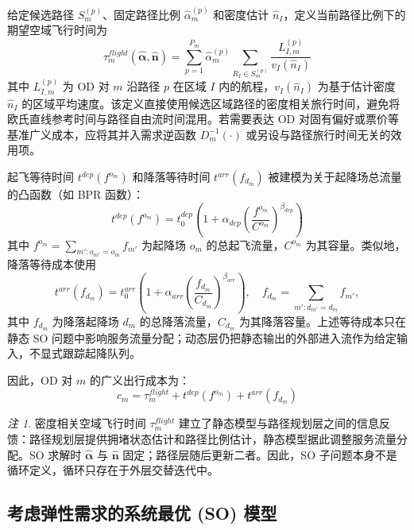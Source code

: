 \documentclass[a4paper,12pt]{article}
\theoremstyle{plain}
\theoremstyle{definition}
\theoremstyle{remark}
\newtheorem{remark}[theorem]{注}
\begin{document}
给定候选路径 $S_m^{(p)}$、固定路径比例 $\widehat\alpha_m^{(p)}$ 和密度估计 $\hat n_I$，定义当前路径比例下的期望空域飞行时间为
\begin{equation}\label{eq:air_flight_time}
    \tau_m^{flight}(\widehat{\bm\alpha},\hat{\bm n})
    =
    \sum_{p=1}^{P_m}\widehat\alpha_m^{(p)}
    \sum_{R_I \in S_m^{(p)}} \frac{L_{I,m}^{(p)}}{v_I(\hat{n}_I)}
\end{equation}
其中 $L_{I,m}^{(p)}$ 为 OD 对 $m$ 沿路径 $p$ 在区域 $I$ 内的航程，$v_I(\hat{n}_I)$ 为基于估计密度 $\hat{n}_I$ 的区域平均速度。该定义直接使用候选区域路径的密度相关旅行时间，避免将欧氏直线参考时间与路径自由流时间混用。若需要表达 OD 对固有偏好或票价等基准广义成本，应将其并入需求逆函数 $D_m^{-1}(\cdot)$ 或另设与路径旅行时间无关的效用项。

起飞等待时间 $t^{dep}(f^{o_m})$ 和降落等待时间 $t^{arr}(f_{d_m})$ 被建模为关于起降场总流量的凸函数（如 BPR 函数）：
\begin{equation}
    t^{dep}(f^{o_m}) = t_0^{dep}\left(1 + \alpha_{dep}\left(\frac{f^{o_m}}{C^{o_m}}\right)^{\beta_{dep}}\right)
\end{equation}
其中 $f^{o_m} = \sum_{m': o_{m'} = o_m} f_{m'}$ 为起降场 $o_m$ 的总起飞流量，$C^{o_m}$ 为其容量。类似地，降落等待成本使用
\begin{equation}
    t^{arr}(f_{d_m}) = t_0^{arr}\left(1 + \alpha_{arr}\left(\frac{f_{d_m}}{C_{d_m}}\right)^{\beta_{arr}}\right),
    \quad
    f_{d_m}=\sum_{m': d_{m'}=d_m} f_{m'},
\end{equation}
其中 $f_{d_m}$ 为降落起降场 $d_m$ 的总降落流量，$C_{d_m}$ 为其降落容量。上述等待成本只在静态 SO 问题中影响服务流量分配；动态层仍把静态输出的外部进入流作为给定输入，不显式跟踪起降队列。

因此，OD 对 $m$ 的广义出行成本为：
\begin{equation}\label{eq:generalized_cost}
    c_m = \tau_m^{flight} + t^{dep}(f^{o_m}) + t^{arr}(f_{d_m})
\end{equation}

\begin{remark}
密度相关空域飞行时间 $\tau_m^{flight}$ 建立了静态模型与路径规划层之间的信息反馈：路径规划层提供拥堵状态估计和路径比例估计，静态模型据此调整服务流量分配。SO 求解时 $\widehat{\bm\alpha}$ 与 $\hat{\bm n}$ 固定；路径层随后更新二者。因此，SO 子问题本身不是循环定义，循环只存在于外层交替迭代中。
\end{remark}

\subsection{考虑弹性需求的系统最优 (SO) 模型}
\end{document}

